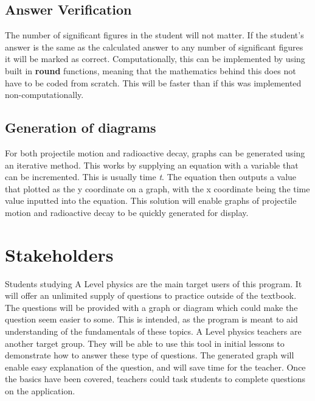 \subsection{Answer Verification}
The number of significant figures in the student will not matter. If the student's answer is the same as the calculated answer to any number of significant figures it will be marked as correct. Computationally, this can be implemented by using built in \textbf{round} functions, meaning that the mathematics behind this does not have to be coded from scratch. This will be faster than if this was implemented non-computationally.
\subsection{Generation of diagrams}
For both projectile motion and radioactive decay, graphs can be generated using an iterative method. This works by supplying an equation with a variable that can be incremented. This is usually time \textit{t}. The equation then outputs a value that plotted as the y coordinate on a graph, with the x coordinate being the time value inputted into the equation. This solution will enable graphs of projectile motion and radioactive decay to be quickly generated for display.
\section{Stakeholders}
Students studying A Level physics are the main target users of this program. It will offer an unlimited supply of questions to practice outside of the textbook. The questions will be provided with a graph or diagram which could make the question seem easier to some. This is intended, as the program is meant to aid understanding of the fundamentals of these topics. 
A Level physics teachers are another target group. They will be able to use this tool in initial lessons to demonstrate how to answer these type of questions. The generated graph will enable easy explanation of the question, and will save time for the teacher. Once the basics have been covered, teachers could task students to complete questions on the application.
\clearpage
